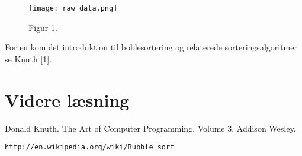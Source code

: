\documentclass{article}
\begin{document}
\begin{figure}
\centering
\texttt{[image: raw\_data.png]}
\caption{\label{fig:data}Figur 1.}
\end{figure}

For en komplet introduktion til boblesortering og relaterede sorteringsalgoritmer se Knuth [1].




\section{Videre læsning}

\begin{thebibliography}{9}

    Donald Knuth. The Art of Computer Programming, Volume 3. Addison Wesley. 
    
    \texttt{http://en.wikipedia.org/wiki/Bubble\_sort}

\end{thebibliography}
\end{document}
